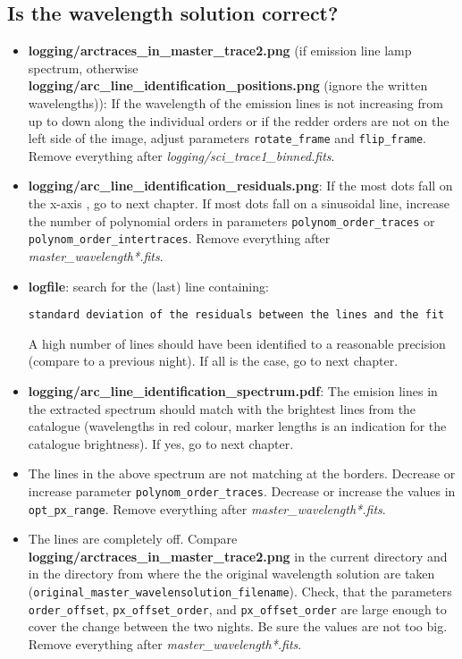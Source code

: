 \documentclass[10pt,a4paper]{article}
\begin{document}
\subsection{Is the wavelength solution correct?}
\label{Section:FAQ_wavelength_solution}
\begin{itemize}
  \item \textbf{logging/arctraces\_in\_master\_trace2.png} (if emission line lamp spectrum, otherwise\\ \textbf{logging/arc\_line\_identification\_positions.png} (ignore the written wavelengths)): If the wavelength of the emission lines is not increasing from up to down along the individual orders or if the redder orders are not on the left side of the image, adjust parameters \verb|rotate_frame| and \verb|flip_frame|. Remove everything after \textit{logging/sci\_trace1\_binned.fits}.
  \item \textbf{logging/arc\_line\_identification\_residuals.png}: If the most dots fall on the x-axis , go to next chapter. If most dots fall on a sinusoidal line, increase the number of polynomial orders in parameters \verb|polynom_order_traces| or \verb|polynom_order_intertraces|. Remove everything after \textit{master\_wavelength*.fits}.
  \item \textbf{logfile}: search for the (last) line containing:
  \begin{lstlisting}[style=base]
 standard deviation of the residuals between the lines and the fit
  \end{lstlisting}
  A high number of lines should have been identified to a reasonable precision (compare to a previous night). If all is the case, go to next chapter.
  \item \textbf{logging/arc\_line\_identification\_spectrum.pdf}: The emision lines in the extracted spectrum should match with the brightest lines from the catalogue (wavelengths in red colour, marker lengths is an indication for the catalogue brightness). If yes, go to next chapter.
  \item The lines in the above spectrum are not matching at the borders. Decrease or increase parameter \verb|polynom_order_traces|. Decrease or increase the values in \verb|opt_px_range|. Remove everything after \textit{ master\_wavelength*.fits}.
  \item The lines are completely off. Compare \textbf{logging/arctraces\_in\_master\_trace2.png} in the current directory and in the directory from where the the original wavelength solution are taken (\verb|original_master_wavelensolution_filename|). Check, that the parameters \verb|order_offset|, \verb|px_offset_order|, and \verb|px_offset_order| are large enough to cover the change between the two nights. Be sure the values are not too big. Remove everything after \textit{master\_wavelength*.fits}.
\end{itemize}
\end{document}
